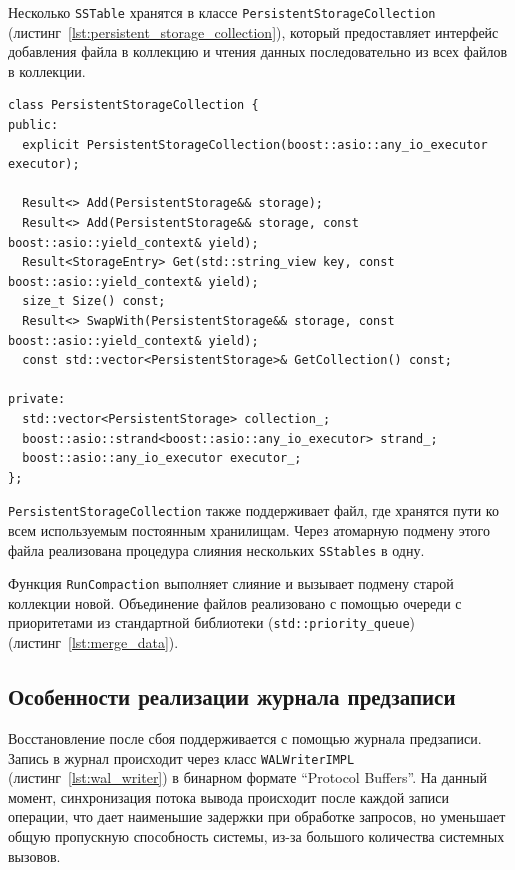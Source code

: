 \documentclass[14pt, russian]{scrartcl}
\newcommand{\refAlgo}[1]{(листинг~\ref{#1})}
\begin{document}
Несколько \verb|SSTable| хранятся в классе \verb|PersistentStorageCollection|
\refAlgo{lst:persistent_storage_collection}, который предоставляет интерфейс
добавления файла в коллекцию и чтения данных последовательно из всех файлов в
коллекции.

\begin{listing}[H]
  \caption{Объявление класса PersistentStorageCollection.}
  \label{lst:persistent_storage_collection}
  \begin{verbatim}
class PersistentStorageCollection {
public:
  explicit PersistentStorageCollection(boost::asio::any_io_executor executor);

  Result<> Add(PersistentStorage&& storage);
  Result<> Add(PersistentStorage&& storage, const boost::asio::yield_context& yield);
  Result<StorageEntry> Get(std::string_view key, const boost::asio::yield_context& yield);
  size_t Size() const;
  Result<> SwapWith(PersistentStorage&& storage, const boost::asio::yield_context& yield);
  const std::vector<PersistentStorage>& GetCollection() const;

private:
  std::vector<PersistentStorage> collection_;
  boost::asio::strand<boost::asio::any_io_executor> strand_;
  boost::asio::any_io_executor executor_;
};
  \end{verbatim}
\end{listing}

\verb|PersistentStorageCollection| также поддерживает файл, где хранятся пути ко
всем используемым постоянным хранилищам. Через атомарную подмену этого файла
реализована процедура слияния нескольких \verb|SStables| в одну.

Функция \verb|RunCompaction| выполняет слияние и вызывает подмену старой
коллекции новой. Объединение файлов реализовано с помощью очереди с приоритетами
из стандартной библиотеки (\verb|std::priority_queue|) \refAlgo{lst:merge_data}.

\subsection{Особенности реализации журнала предзаписи}

Восстановление после сбоя поддерживается с помощью журнала предзаписи. Запись в
журнал происходит через класс \verb|WALWriterIMPL| \refAlgo{lst:wal_writer} в
бинарном формате ``Protocol Buffers''. На данный момент, синхронизация потока
вывода происходит после каждой записи операции, что дает наименьшие задержки при
обработке запросов, но уменьшает общую пропускную способность системы, из-за
большого количества системных вызовов.
\end{document}
